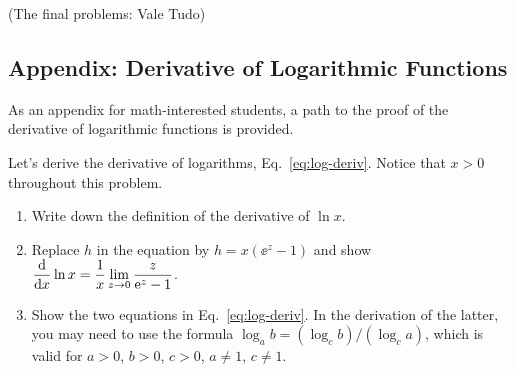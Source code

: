 \documentclass[11pt,pdfa,lastpage]{MishoNote}
\begin{document}
\ornamentskip

\begin{enumerate}[resume]
 \itemC \textsf{(The final problems: Vale Tudo)}
    \begin{menumerate}{3}
   \end{menumerate}
 \end{enumerate}

\newpage

\subsection{Appendix: Derivative of Logarithmic Functions}
As an appendix for math-interested students, a path to the proof of the derivative of logarithmic functions is provided.


\ornamentskip
\begin{enumerate}[resume]
  \itemC Let's derive the derivative of logarithms,  Eq.~\eqref{eq:log-deriv}. Notice that $x>0$ throughout this problem.
  \begin{enumerate}
    \item Write down the definition of the derivative of $\ln x$.
    \item Replace $h$ in the equation by $h=x(\ee^z-1)$ and show
    $\displaystyle\diff{}{x}\ln x = \frac{1}{x}\lim_{z\to 0} \frac{z}{\ee^z-1}$.
    \item Show the two equations in Eq.~\eqref{eq:log-deriv}. In the derivation of the latter, you may need to use the formula $\log_a b = ({\log_c b})/({\log_c a})$, which is valid for $a>0$, $b>0$, $c>0$, $a\neq 1$, $c\neq 1$.
  \end{enumerate}
\end{enumerate}
\end{document}

